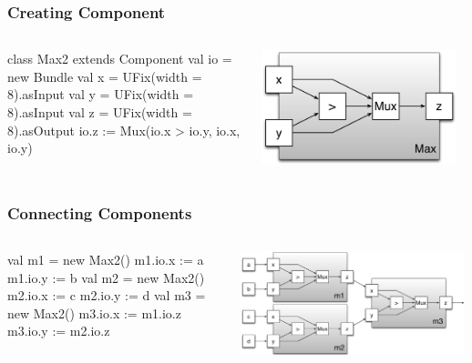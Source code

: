\documentclass[xcolor=pdflatex,dvipsnames,table]{beamer}
\begin{document}
\begin{frame}[fragile]
\frametitle{Creating Component}

\begin{columns}

{
\begin{scala}
class Max2 extends Component {
  val io = new Bundle {
    val x = UFix(width = 8).asInput
    val y = UFix(width = 8).asInput
    val z = UFix(width = 8).asOutput }
  io.z := Mux(io.x > io.y, io.x, io.y)
}
\end{scala}
}

\begin{center}
\includegraphics[width=0.95\textwidth]{figs/Max2c.pdf} \\
\end{center}
\end{columns}

\end{frame}

\begin{frame}[fragile]
\frametitle{Connecting Components}

\begin{columns}
\begin{scala}
val m1 = new Max2()
m1.io.x := a
m1.io.y := b
val m2 = new Max2()
m2.io.x := c
m2.io.y := d
val m3 = new Max2()
m3.io.x := m1.io.z
m3.io.y := m2.io.z
\end{scala}


\begin{center}
\includegraphics[width=0.99\textwidth]{figs/Max4.pdf} \\
\end{center}
\end{columns}

\end{frame}
\end{document}
